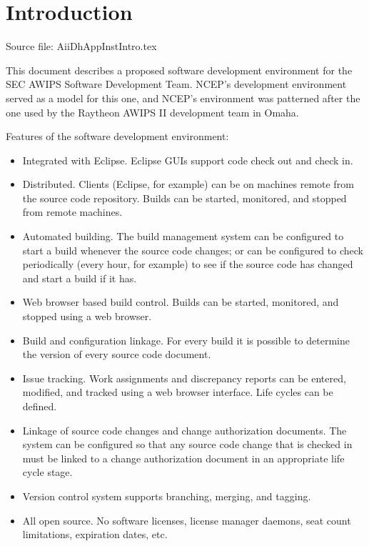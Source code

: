 
\section{Introduction}

Source file: AiiDhAppInstIntro.tex

This document describes a proposed software development environment for
the SEC AWIPS Software Development Team.  NCEP's development environment
served as a model for this one, and NCEP's environment was patterned
after the one used by the Raytheon AWIPS II development team in Omaha.

Features of the software development environment:
\begin{itemize}
\item
Integrated with Eclipse.  Eclipse GUIs support code check out and check in.

\item
Distributed.  Clients (Eclipse, for example) can be on machines remote from the source code repository.  Builds can be started, monitored, and stopped from remote machines.

\item
Automated building.  The build management system can be configured to start a build whenever the source code changes; or can be configured to check periodically (every hour, for example) to see if the source code has changed and start a build if it has.

\item
Web browser based build control.  Builds can be started, monitored, and stopped using a web browser.

\item
Build and configuration linkage.  For every build it is possible to determine the version of every source code document.

\item
Issue tracking.  Work assignments and discrepancy reports can  be entered, modified, and tracked using a web browser interface.  Life cycles can be defined.

\item
Linkage of source code changes and change authorization documents.
The system can be configured so that any source code change that is
checked in must be linked to a change authorization document in an
appropriate life cycle stage.

\item
Version control system supports branching, merging, and tagging.

\item
All open source.  No software licenses, license manager daemons, seat
count limitations, expiration dates, etc.

\end{itemize}

